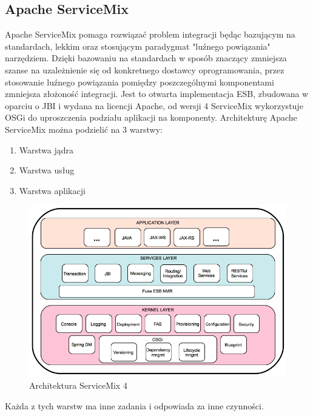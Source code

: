 \subsection{Apache ServiceMix}
Apache ServiceMix pomaga rozwiązać problem integracji będąc bazującym na standardach, lekkim oraz stosującym paradygmat "luźnego powiązania" narzędziem. Dzięki bazowaniu na standardach w sposób znaczący zmniejsza szanse na uzależnienie się od konkretnego dostawcy oprogramowania, przez stosowanie luźnego powiązania pomiędzy poszczególnymi komponentami zmniejsza złożoność integracji. Jest to otwarta implementacja ESB, zbudowana w oparciu o JBI i wydana na licencji Apache, od wersji 4 ServiceMix wykorzystuje OSGi do uproszczenia podziału aplikacji na komponenty. 	
Architekturę Apache ServiceMix można podzielić na 3 warstwy:
\begin{enumerate}
	\item Warstwa jądra
	\item Warstwa usług
	\item Warstwa aplikacji
\end{enumerate}  
\begin{figure}[!h]
	\centering
	\includegraphics[scale=0.45]{ServiceMixArchitektura.jpg} 
	\caption{Architektura ServiceMix 4}
\end{figure}
Każda z tych warstw ma inne zadania i odpowiada za inne czynności.
